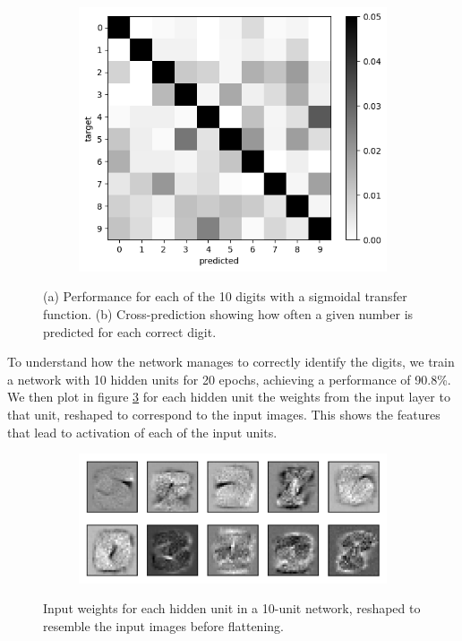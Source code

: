 \documentclass{article}
\begin{document}
\begin{figure}[h]
\begin{subfigure}[t]{0.42\linewidth}
		\includegraphics[width = 1.0\linewidth, trim={0 0 0 0}, clip=true]{figures/predictions_sigmoid.png}
		\subcaption{}
		\label{fig:predictions_sigmoid}	
	\end{subfigure}%
\caption{(a) Performance for each of the 10 digits with a sigmoidal transfer function. (b) Cross-prediction showing how often a given number is predicted for each correct digit.}
\label{fig:prediction_error_sigmoid}
\end{figure}

\newpage

To understand how the network manages to correctly identify the digits, we train a network with 10 hidden units for 20 epochs, achieving a performance of 90.8\%. We then plot in figure \ref{fig:w1s_N10} for each hidden unit the weights from the input layer to that unit, reshaped to correspond to the input images. This shows the features that lead to activation of each of the input units.

\begin{figure}[h]
	\centering
	\begin{subfigure}[t]{0.92\linewidth}
		\centering
		\includegraphics[width = 1.0\linewidth, trim={0 0 0 0}, clip=true]{figures/w1s_N10_weightfig.png}	
	\end{subfigure}%
\caption{Input weights for each hidden unit in a 10-unit network, reshaped to resemble the input images before flattening.}
\label{fig:w1s_N10}
\end{figure}
\end{document}
